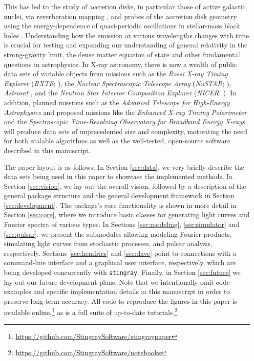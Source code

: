 \documentclass[twocolumn]{aastex62}
\newcommand{\project}[1]{\textsl{#1}\xspace}
\newcommand{\nustar}{\project{NuSTAR}\xspace}
\newcommand{\stingray}{\texttt{stingray}\xspace}
\begin{document}
This has led to the study of accretion disks, in particular those of active galactic nuclei, via reverberation mapping \citep[e.g.,][]{blandford1982,Bentz2016}, and probes of the accretion disk geometry using the energy-dependence of quasi-periodic oscillations in stellar-mass black holes \citep[e.g.,][]{ingram2015,stevensuttley2016}. 
Understanding how the emission at various wavelengths changes with time is crucial for testing and expanding our understanding of general relativity in the strong-gravity limit, the dense matter equation of state and other fundamental questions in astrophysics.
In X-ray astronomy, there is now a wealth of public data sets of variable objects from missions such as the \textit{Rossi X-ray Timing Explorer}  (\textit{RXTE}; \citealt{Bradtetal93}), the \textit{Nuclear Spectroscopic Telescope Array} (\nustar; \citealt{nustar13}), \textit{Astrosat} \citep{singh2014}, and the \textit{Neutron Star Interior Composition Explorer} (\textit{NICER}; \citealt{gendreau2016}). 
In addition, planned missions such as the \textit{Advanced Telescope for High-Energy Astrophysics} \citep[\textit{Athena};][]{athenaXIFU} and proposed missions like the \textit{Enhanced X-ray Timing Polarimeter} \citep[\textit{eXTP};][]{extp16} and the \textit{Spectroscopic Time-Resolving Observatory for Broadband Energy X-rays} \citep[\textit{STROBE-X};][]{strobex18} will produce data sets of unprecedented size and complexity, motivating the need for both scalable algorithms as well as the well-tested, open-source software described in this manuscript.

The paper layout is as follows: 
In Section \ref{sec:data}, we very briefly describe the data sets being used in this paper to showcase the implemented methods. 
In Section \ref{sec:vision}, we lay out the overall vision, followed by a description of the general package structure and the general development framework in Section \ref{sec:development}. 
The package's core functionality is shown in more detail in Section \ref{sec:core}, where we introduce basic classes for generating light curves and Fourier spectra of various types.
In Sections \ref{sec:modeling}, \ref{sec:simulator} and \ref{sec:pulsar}, we present the submodules allowing modeling Fourier products, simulating light curves from stochastic processes, and pulsar analysis, respectively.
Sections \ref{sec:hendrics} and \ref{sec:dave} point to connections with a command-line interface and a graphical user interface, respectively, which are being developed concurrently with \stingray. 
Finally, in Section \ref{sec:future} we lay out our future development plans. 
Note that we intentionally omit code examples and specific implementation details in this manuscript in order to preserve long-term accuracy. 
All code to reproduce the figures in this paper is available online,\footnote{\url{https://github.com/StingraySoftware/stingraypaper}} as is a full suite of up-to-date tutorials.\footnote{\label{foot:nb}\url{https://github.com/StingraySoftware/notebooks}}
\end{document}
